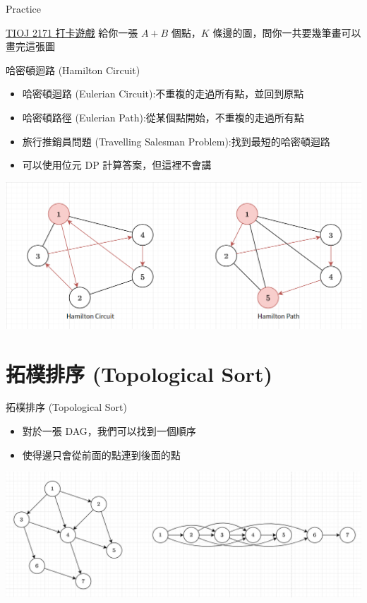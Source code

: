 \documentclass[aspectratio=169]{beamer}
\begin{document}
    \begin{frame}{Practice}
        \begin{block}{\href{https://tioj.ck.tp.edu.tw/problems/2171}{TIOJ 2171 打卡遊戲}}
        給你一張 $A+B$ 個點，$K$ 條邊的圖，問你一共要幾筆畫可以畫完這張圖
        \end{block}
    \end{frame}
    
    \begin{frame}{哈密頓迴路 (Hamilton Circuit)}
        \begin{itemize}
            \item 哈密頓迴路 (Eulerian Circuit):不重複的走過所有點，並回到原點
            \item 哈密頓路徑 (Eulerian Path):從某個點開始，不重複的走過所有點
            \item 旅行推銷員問題 (Travelling Salesman Problem):找到最短的哈密頓迴路
            \item 可以使用位元 DP 計算答案，但這裡不會講
        \end{itemize}
        \begin{center}
            \includegraphics[scale=0.4]{images/hamilton_circuit.png}
        \end{center}
    \end{frame}
    
    \section{拓樸排序 (Topological Sort)}
    
    \begin{frame}{拓樸排序 (Topological Sort)}
        \begin{itemize}
            \item 對於一張 DAG，我們可以找到一個順序
            \item 使得邊只會從前面的點連到後面的點
        \end{itemize}
        \begin{center}
            \includegraphics[scale=0.4]{images/topological sort.png}
        \end{center}
    \end{frame}
    
\end{document}
